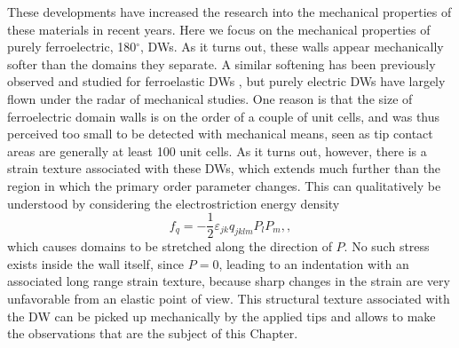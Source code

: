 These developments have increased the research into the mechanical properties of these materials in recent years. Here we focus on the mechanical properties of purely ferroelectric, 180$^\circ$, DWs.
As it turns out, these walls appear mechanically softer than the domains they separate.
A similar softening has been previously observed and studied for ferroelastic DWs \cite{Lee2003}, but purely electric DWs have largely flown under the radar of mechanical studies.
One reason is that the size of ferroelectric domain walls is on the order of a couple of unit cells, and was thus perceived too small to be detected with mechanical means, seen as tip contact areas are generally at least 100 unit cells.
As it turns out, however, there is a strain texture associated with these DWs, which extends much further than the region in which the primary order parameter changes.
This can qualitatively be understood by considering the electrostriction energy density
\begin{equation}
f_{q}=-\frac{1}{2}\varepsilon_{jk}q_{jklm}P_{l}P_{m},\label{eq:qpp},
\end{equation}
which causes domains to be stretched along the direction of $P$.
No such stress exists inside the wall itself, since $P=0$, leading to an indentation with an associated long range strain texture, because sharp changes in the strain are very unfavorable from an elastic point of view.
This structural texture associated with the DW can be picked up mechanically by the applied tips and allows to make the observations that are the subject of this Chapter.

